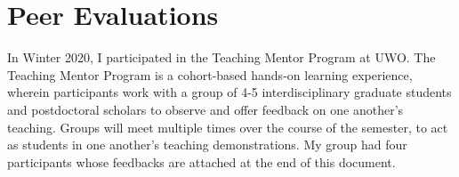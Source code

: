 \documentclass[
]{report}
\begin{document}
\hypertarget{peer-evaluations}{%
\section{Peer Evaluations}\label{peer-evaluations}}

In Winter 2020, I participated in the Teaching Mentor Program at UWO.
The Teaching Mentor Program is a cohort-based hands-on learning experience, wherein participants
work with a group of 4-5 interdisciplinary graduate students and postdoctoral scholars to observe
and offer feedback on one another's teaching. Groups will meet multiple times over the course of
the semester, to act as students in one another's teaching demonstrations. My group had four
participants whose feedbacks are attached at the end of this document.
\end{document}
